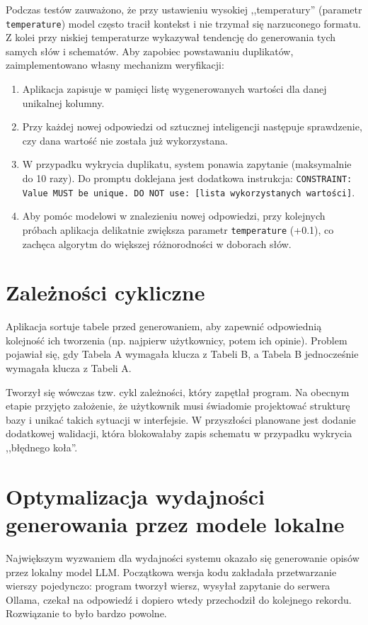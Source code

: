 Podczas testów zauważono, że przy ustawieniu wysokiej ,,temperatury'' (parametr \texttt{temperature}) model często tracił kontekst i nie trzymał się narzuconego formatu. Z kolei przy niskiej temperaturze wykazywał tendencję do generowania tych samych słów i schematów. Aby zapobiec powstawaniu duplikatów, zaimplementowano własny mechanizm weryfikacji:
\begin{enumerate}
    \item Aplikacja zapisuje w pamięci listę wygenerowanych wartości dla danej unikalnej kolumny.
    \item Przy każdej nowej odpowiedzi od sztucznej inteligencji następuje sprawdzenie, czy dana wartość nie została już wykorzystana.
    \item W przypadku wykrycia duplikatu, system ponawia zapytanie (maksymalnie do 10 razy). Do promptu doklejana jest dodatkowa instrukcja: \texttt{CONSTRAINT: Value MUST be unique. DO NOT use: [lista wykorzystanych wartości]}.
    \item Aby pomóc modelowi w znalezieniu nowej odpowiedzi, przy kolejnych próbach aplikacja delikatnie zwiększa parametr \texttt{temperature} (+0.1), co zachęca algorytm do większej różnorodności w doborach słów.
\end{enumerate}

\section{Zależności cykliczne}
Aplikacja sortuje tabele przed generowaniem, aby zapewnić odpowiednią kolejność ich tworzenia (np. najpierw użytkownicy, potem ich opinie). Problem pojawiał się, gdy Tabela A wymagała klucza z Tabeli B, a Tabela B jednocześnie wymagała klucza z Tabeli A.

Tworzył się wówczas tzw. cykl zależności, który zapętlał program. Na obecnym etapie przyjęto założenie, że użytkownik musi świadomie projektować strukturę bazy i unikać takich sytuacji w interfejsie. W przyszłości planowane jest dodanie dodatkowej walidacji, która blokowałaby zapis schematu w przypadku wykrycia ,,błędnego koła''.

\section{Optymalizacja wydajności generowania przez modele lokalne}
\label{sec:llm_optimization}

Największym wyzwaniem dla wydajności systemu okazało się generowanie opisów przez lokalny model LLM. Początkowa wersja kodu zakładała przetwarzanie wierszy pojedynczo: program tworzył wiersz, wysyłał zapytanie do serwera Ollama, czekał na odpowiedź i dopiero wtedy przechodził do kolejnego rekordu. Rozwiązanie to było bardzo powolne.


